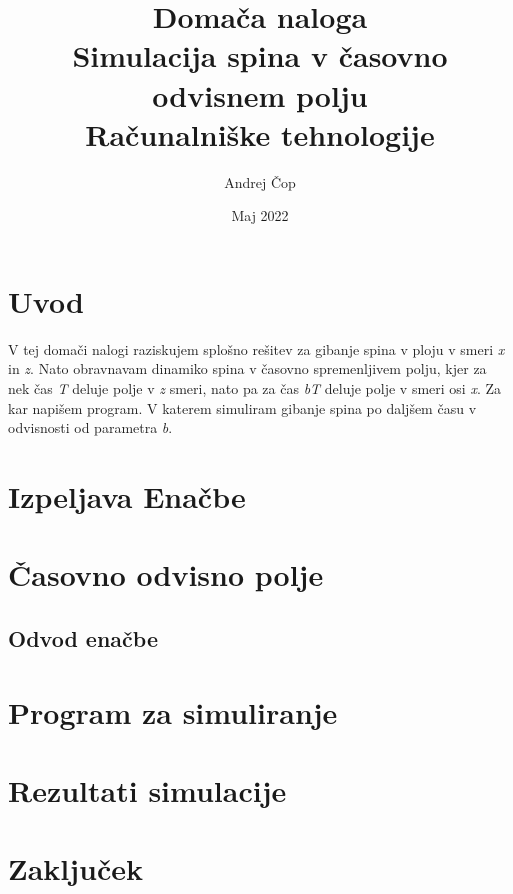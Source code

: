 \documentclass[12pt, a4paper]{article}
\title{  Domača naloga\\\large\textbf{Simulacija spina v časovno odvisnem polju}\\
\large Računalniške tehnologije}
\author{Andrej Čop}
\date{Maj 2022}
\begin{document}
\maketitle
\newpage

\tableofcontents
\newpage

\section{Uvod}
V tej domači nalogi raziskujem splošno rešitev za gibanje spina v ploju v smeri \textit{x} in \textit{z}. Nato obravnavam dinamiko spina v časovno spremenljivem polju, kjer za nek čas \textit{T} deluje polje v \textit{z} smeri, nato pa za čas \textit{bT} deluje polje v smeri osi \textit{x}. Za kar napišem program. V katerem simuliram gibanje spina po daljšem času v odvisnosti od parametra \textit{b}.
\section{Izpeljava Enačbe}

\section{Časovno odvisno polje}

\subsection{Odvod enačbe}

\section{Program za simuliranje}

\section{Rezultati simulacije}

\section{Zaključek}
\end{document}
